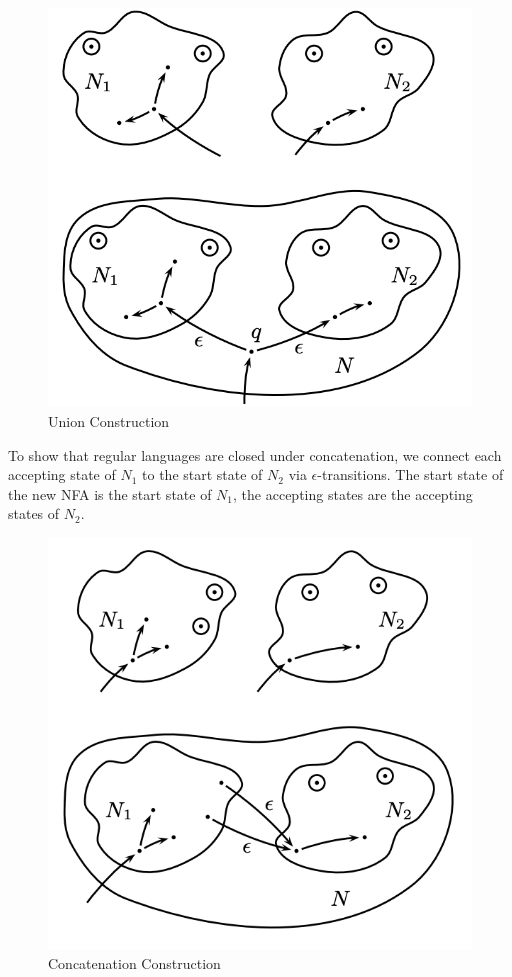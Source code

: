 \documentclass{article}
\begin{document}
    \begin{figure}[h!]
        \centering
        \includegraphics[scale=0.5]{images/union.png}
        \caption{Union Construction}
        \label{fig:union}
    \end{figure}

    To show that regular languages are closed under concatenation, we connect each accepting state of $N_1$ to the start state of $N_2$ via $\epsilon$-transitions. The start state of the new NFA is the start state of $N_1$, the accepting states are the accepting states of $N_2$. 

    \begin{figure}[H]
        \centering
        \includegraphics[scale=0.5]{images/concatenation.png}
        \caption{Concatenation Construction}
        \label{fig:concatenation}
    \end{figure}
\end{document}
